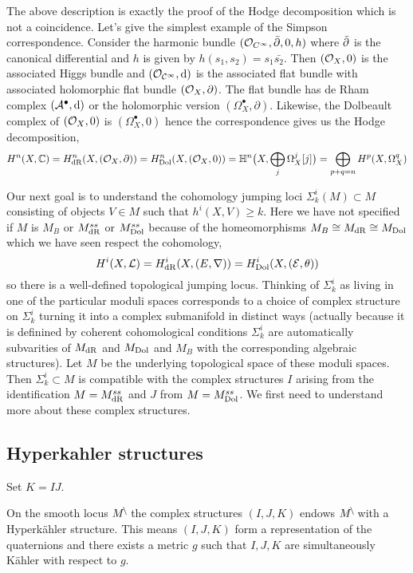 \documentclass[12pt]{article}
\begin{document}
\begin{rmk}
The above description is exactly the proof of the Hodge decomposition which is not a coincidence. Let's give the simplest example of the Simpson correspondence. Consider the harmonic bundle $(\mathcal{O}_{C^\infty}, \bar{\partial}, 0, h)$ where $\bar{\partial}$ is the canonical differential and $h$ is given by $h(s_1, s_2) = s_1 \bar{s_2}$. Then $(\mathcal{O}_{X}, 0)$ is the associated Higgs bundle and $(\mathcal{O}_{\mathcal{C}^\infty}, \mathrm{d})$ is the associated flat bundle with associated holomorphic flat bundle $(\mathcal{O}_{X}, \partial)$. The flat bundle has de Rham complex $(\mathcal{A}^\bullet, \mathrm{d})$ or the holomorphic version $(\Omega_X^\bullet, \partial)$. Likewise, the Dolbeault complex of $(\mathcal{O}_{X}, 0)$ is $(\Omega_X^\bullet, 0)$ hence the correspondence gives us the Hodge decomposition,
\[ H^n(X, \mathbb{C}) = H_{\mathrm{dR}}^n(X, (\mathcal{O}_{X}, \partial)) = H_{\mathrm{Dol}}^n(X, (\mathcal{O}_{X}, 0)) = \mathbb{H}^n\big(X, \bigoplus_j \Omega_X^j[j]\big) = \bigoplus_{p+q=n} H^p(X, \Omega_X^q) \]
\end{rmk}


Our next goal is to understand the cohomology jumping loci $\Sigma^i_k(M) \subset M$ consisting of objects $V \in M$ such that $h^i(X, V) \ge k$. Here we have not specified if $M$ is $M_{B}$ or $M_{\mathrm{dR}}^{ss}$ or $M_{\mathrm{Dol}}^{ss}$ because of the homeomorphisms $M_B \cong M_{\mathrm{dR}} \cong M_{\mathrm{Dol}}$ which we have seen respect the cohomology,
\[ H^i(X, \mathcal{L}) = H^i_{\mathrm{dR}}(X, (E, \nabla)) = H^i_{\mathrm{Dol}}(X, (\mathcal{E}, \theta)) \]
so there is a well-defined topological jumping locus. Thinking of $\Sigma^i_k$ as living in one of the particular moduli spaces corresponds to a choice of complex structure on $\Sigma^i_k$ turning it into a complex submanifold in distinct ways (actually because it is definined by coherent cohomological conditions $\Sigma^i_k$ are automatically subvarities of $M_{\mathrm{dR}}$ and $M_{\mathrm{Dol}}$ and $M_B$ with the corresponding algebraic structures). Let $M$ be the underlying topological space of these moduli spaces. Then $\Sigma^i_k \subset M$ is compatible with the complex structures $I$ arising from the identification $M = M_{\mathrm{dR}}^{ss}$ and $J$ from $M = M_{\mathrm{Dol}}^{ss}$. We first need to understand more about these complex structures.


\subsection{Hyperkahler structures}

Set $K = IJ$.

\begin{theorem}
On the smooth locus $M^{\! \setminus \!}$ the complex structures $(I, J, K)$ endows $M^{\! \setminus \!}$ with a Hyperk\"{a}hler structure. This means $(I, J, K)$ form a representation of the quaternions and there exists a metric $g$ such that $I,J,K$ are simultaneously K\"{a}hler with respect to $g$.
\end{theorem}
\end{document}
